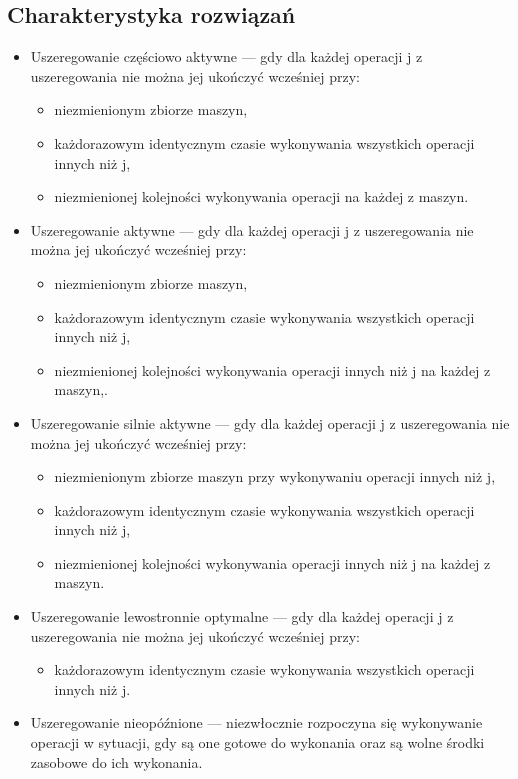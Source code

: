 \documentclass[10pt, a
4paper]{article}
\begin{document}
\subsection{Charakterystyka rozwiązań}
\begin{itemize}
\item Uszeregowanie częściowo aktywne --- gdy dla każdej operacji j z uszeregowania nie można jej ukończyć wcześniej przy:
\begin{itemize}
\item niezmienionym zbiorze maszyn,
\item każdorazowym identycznym czasie wykonywania wszystkich operacji innych niż j,
\item niezmienionej kolejności wykonywania operacji na każdej z maszyn.
\end{itemize}
\item Uszeregowanie aktywne ---  gdy dla każdej operacji j z uszeregowania nie można jej ukończyć wcześniej przy:
\begin{itemize}
\item niezmienionym zbiorze maszyn,
\item każdorazowym identycznym czasie wykonywania wszystkich operacji innych niż j,
\item niezmienionej kolejności wykonywania operacji innych niż j na każdej z maszyn,.
\end{itemize}
\item Uszeregowanie silnie aktywne --- gdy dla każdej operacji j z uszeregowania nie można jej ukończyć wcześniej przy:
\begin{itemize}
\item niezmienionym zbiorze maszyn przy wykonywaniu operacji innych niż j,
\item każdorazowym identycznym czasie wykonywania wszystkich operacji innych niż j,
\item niezmienionej kolejności wykonywania operacji innych niż j na każdej z maszyn.
\end{itemize}
\item Uszeregowanie lewostronnie optymalne ---  gdy dla każdej operacji j z uszeregowania nie można jej ukończyć wcześniej przy:
\begin{itemize}
\item każdorazowym identycznym czasie wykonywania wszystkich operacji innych niż j.
\end{itemize}	
\item Uszeregowanie nieopóźnione --- niezwłocznie rozpoczyna się wykonywanie operacji w sytuacji, gdy są one gotowe do wykonania oraz są wolne środki zasobowe do ich wykonania.

\end{itemize}
\end{document}
